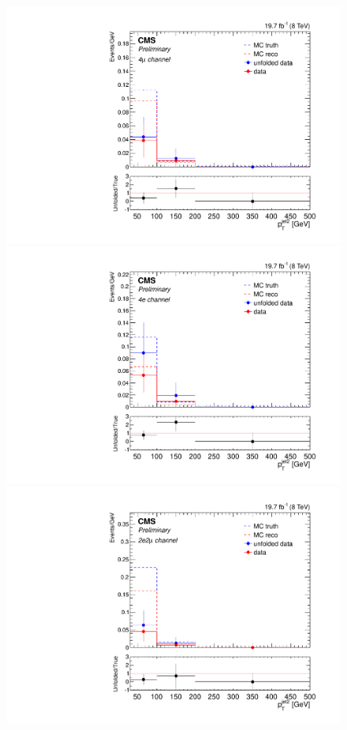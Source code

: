 \begin{figure}[hbtp]
  \begin{center}
    \includegraphics[width=\cmsFigWidth]{Figures/PtJet2_ZZTo4m_Mad_fr_binwidth}
    \includegraphics[width=\cmsFigWidth]{Figures/PtJet2_ZZTo4e_Mad_fr_binwidth}
    \includegraphics[width=\cmsFigWidth]{Figures/PtJet2_ZZTo2e2m_Mad_fr_binwidth}  

\end{center}
\end{figure}
